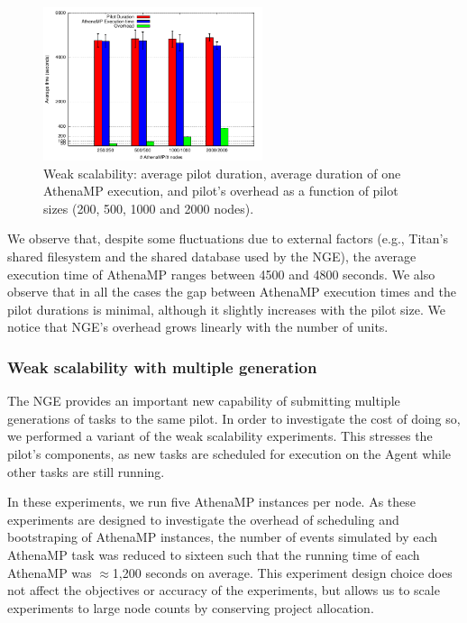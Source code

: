 \begin{figure}[!t]
    \includegraphics[height=4.5cm,width=\columnwidth]{weak1.pdf}
   	\vspace{-0.3in}
    \caption{Weak scalability: average pilot duration, average duration of
    one AthenaMP execution, and pilot's overhead as a function of pilot sizes
    (200, 500, 1000 and 2000 nodes).}\label{fig:weakScal1a}
\end{figure}

We observe that, despite some fluctuations due to external factors (e.g.,
Titan's shared filesystem and the shared database used by the NGE), the
average execution time of AthenaMP ranges between 4500 and 4800 seconds. We
also observe that in all the cases the gap between AthenaMP execution times
and the pilot durations is minimal, although it slightly increases with the
pilot size. We notice that NGE's overhead grows linearly with the number
of units.

\subsubsection{Weak scalability with multiple generation}

The NGE provides an important new capability of submitting multiple
generations of tasks to the same pilot. In order to investigate the cost
of doing so, we performed a variant of the weak scalability experiments. This
stresses the pilot's components, as new tasks are scheduled for execution on
the Agent while other tasks are still running.

In these experiments, we run five AthenaMP instances per node. As these
experiments are designed to investigate the overhead of  scheduling and
bootstraping of AthenaMP instances, the number of events simulated by each
AthenaMP task was reduced to sixteen such that the running time of each
AthenaMP was \(\approx\)1,200 seconds on average. This experiment design
choice does not affect the objectives or accuracy of the experiments, but
allows us to scale experiments to large node counts by conserving project
allocation.

